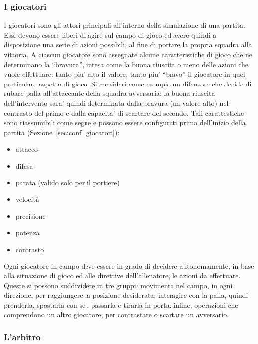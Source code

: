 \subsubsection{I giocatori}
\label{sec:analisi_giocatori}

I giocatori sono gli attori principali all'interno della simulazione di una partita. Essi devono essere liberi di agire sul campo di gioco ed avere quindi a disposizione una serie di azioni possibili, al fine di portare la propria squadra alla vittoria. A ciascun giocatore sono assegnate alcune caratteristiche di gioco che ne determinano la ``bravura'', intesa come la buona riuscita o meno delle azioni che vuole effettuare: tanto piu' alto il valore, tanto piu' ``bravo'' il giocatore in quel particolare aspetto di gioco. Si consideri come esempio un difensore che decide di rubare palla all'attaccante della squadra avversaria: la buona riuscita dell'intervento sara' quindi determinata dalla bravura (un valore alto) nel contrasto del primo e dalla capacita' di scartare del secondo. Tali carattestiche sono riassumibili come segue e possono essere configurati prima dell'inizio della partita (Sezione~\ref{sec:conf_giocatori}):

\begin{itemize}
	\item attacco
	\item difesa
	\item parata (valido solo per il portiere)
	\item velocit\`{a}
	\item precisione
	\item potenza
	\item contrasto
\end{itemize}

Ogni giocatore in campo deve essere in grado di decidere autonomamente, in base alla situazione di gioco ed alle direttive dell'allenatore, le azioni da effettuare. Queste  si possono suddividere in tre gruppi: movimento nel campo, in ogni direzione, per raggiungere la posizione desiderata; interagire con la palla, quindi prenderla, spostarla con se', passarla e tirarla in porta; infine, operazioni che comprendono un altro giocatore, per contrastare o scartare un avversario.\\

\subsubsection{L'arbitro}
\label{sec:analisi_arbitro}

